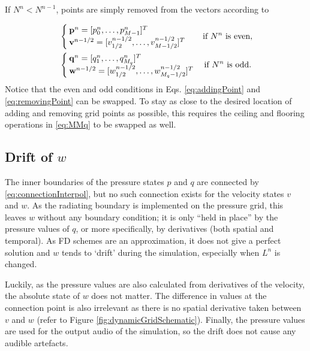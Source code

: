 If $N^n < N^{n-1}$, points are simply removed from the vectors according to

\begin{equation}\label{eq:removingPoint}
    \begin{aligned}
        &\begin{cases}
            \mathbf{p}^n = [p_0^n, \hdots, p_{M-1}^n]^T\\
            \mathbf{v}^{n-1/2} = [v_{1/2}^{n-1/2}, \hdots, v_{M-1/2}^{n-1/2}]^T
        \end{cases}
        \quad\!\text{if $N^n$ is even},\\
        &\begin{cases}
            \mathbf{q}^n = [q_1^n, \hdots, q_{M_q}^n]^T\\
            \mathbf{w}^{n-1/2} = [w_{1/2}^{n-1/2},\hdots, w_{M_q-1/2}^{n-1/2}]^T
        \end{cases}\text{if $ N^n$ is odd}.
    \end{aligned}
\end{equation}
Notice that the even and odd conditions in Eqs. \eqref{eq:addingPoint} and \eqref{eq:removingPoint} can be swapped. To stay as close to the desired location of adding and  removing grid points as possible, this requires the ceiling and flooring operations in \eqref{eq:MMq} to be swapped as well.
\subsection{Drift of $w$}\label{sec:drift}
The inner boundaries of the pressure states $p$ and $q$ are connected by \eqref{eq:connectionInterpol}, but no such connection exists for the velocity states $v$ and $w$. As the radiating boundary is implemented on the pressure grid,  this leaves $w$ without any boundary condition; it is only ``held in place'' by the pressure values of $q$, or more specifically, by derivatives (both spatial and temporal). As FD schemes are an approximation, it does not give a perfect solution and $w$ tends to `drift' during the simulation, especially when $L^n$ is changed.

Luckily, as the pressure values are also calculated from derivatives of the velocity, the absolute state of $w$ does not matter. The difference in values at the connection point is also irrelevant as there is no spatial derivative taken between $v$ and $w$ (refer to Figure \ref{fig:dynamicGridSchematic}). Finally, the pressure values are used for the output audio of the simulation, so the drift does not cause any audible artefacts. 

